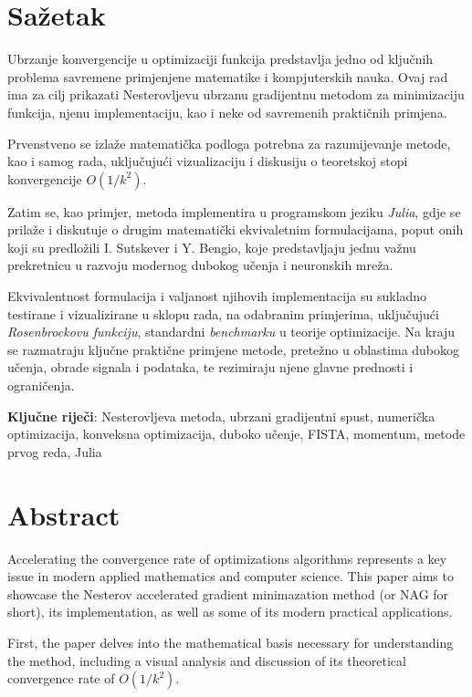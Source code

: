 \pagebreak

\section*{Sažetak}

Ubrzanje konvergencije u optimizaciji funkcija predstavlja jedno od ključnih problema savremene primjenjene matematike i kompjuterskih nauka.
Ovaj rad ima za cilj prikazati Nesterovljevu ubrzanu gradijentnu metodom za minimizaciju funkcija, njenu implementaciju, kao i neke od savremenih praktičnih primjena.

\noindent Prvenstveno se izlaže matematička podloga potrebna za razumijevanje metode, kao i samog rada, uključujući vizualizaciju i diskusiju o teoretskoj stopi konvergencije $O(1/k^2)$.

\noindent Zatim se, kao primjer, metoda implementira u programskom jeziku \textit{Julia}, gdje se prilaže i diskutuje o drugim matematički ekvivaletnim formulacijama, poput
onih koji su predložili I. Sutskever i Y. Bengio, koje predstavljaju jednu važnu prekretnicu u razvoju modernog dubokog učenja i neuronskih mreža.

\noindent Ekvivalentnost formulacija i valjanost njihovih implementacija su sukladno testirane i vizualizirane u sklopu rada, na odabranim primjerima, uključujući \textit{Rosenbrockovu funkciju}, standardni \textit{benchmarku} u teorije optimizacije.
Na kraju se razmatraju ključne praktične primjene metode, pretežno u oblastima dubokog učenja, obrade signala i podataka, te rezimiraju njene glavne prednosti i ograničenja.




\vspace{1cm}
\textbf{Ključne riječi}: Nesterovljeva metoda, ubrzani gradijentni spust, numerička optimizacija, konveksna optimizacija, duboko učenje, FISTA, momentum, metode prvog reda, Julia


\section*{Abstract}

Accelerating the convergence rate of optimizations algorithms represents a key issue in modern applied mathematics and computer science.
This paper aims to showcase the Nesterov accelerated gradient minimazation method (or NAG for short), its implementation, as well as some of its modern practical applications.


\noindent First, the paper delves into the mathematical basis necessary for understanding the method, including a visual analysis and discussion of its theoretical convergence rate of $O(1/k^2)$.


